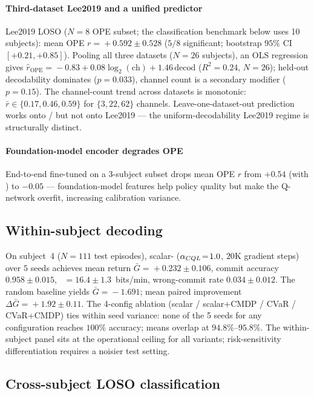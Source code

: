\paragraph*{Third-dataset Lee2019 and a unified predictor}
Lee2019 LOSO ($N\!=\!8$ OPE subset; the classification benchmark
below uses 10 subjects): mean OPE
$r\!=\!+0.592\!\pm\!0.528$ ($5/8$ significant; bootstrap $95\%$ CI
$[+0.21, +0.85]$). Pooling all three datasets ($N\!=\!26$
subjects), an OLS regression gives
$\hat r_{\text{OPE}}\!=\!-0.83+0.08\log_2(\text{ch})+1.46\,\text{decod}$
($R^2\!=\!0.24$, $N\!=\!26$); held-out decodability dominates
($p\!=\!0.033$), channel count is a secondary modifier
($p\!=\!0.15$). The channel-count trend across datasets is
monotonic: $\bar r \in \{0.17, 0.46, 0.59\}$ for $\{3, 22, 62\}$
channels. Leave-one-dataset-out prediction works onto
\bcib{}/\bcia{} but not onto Lee2019 --- the uniform-decodability
Lee2019 regime is structurally distinct.

\paragraph*{Foundation-model encoder degrades OPE}
End-to-end fine-tuned \labram{} on a 3-subject subset drops mean
OPE $r$ from $+0.54$ (with \eegnet{}) to $-0.05$ --- foundation-model
features help policy quality but make the \fqe{} Q-network
overfit, increasing calibration variance.

\subsection{Within-subject decoding}\label{sec:results:within}

On \bcib{} subject~4 ($N\!=\!111$ test episodes), \nettype{}
scalar-\cql{} ($\alpha_{CQL}\!=\!1.0$, $20$K gradient steps) over
$5$ seeds achieves mean return $\bar G\!=\!+0.232 \pm 0.106$,
commit accuracy $0.958 \pm 0.015$, \itr{}~$=\!16.4 \pm 1.3$~bits/min,
wrong-commit rate $0.034 \pm 0.012$. The random baseline yields
$\bar G\!=\!-1.691$; mean paired improvement
$\Delta \bar G\!=\!+1.92 \pm 0.11$. The 4-config ablation
(scalar / scalar+CMDP / CVaR / CVaR+CMDP) ties within seed
variance: none of the 5 seeds for any configuration reaches
$100\%$ accuracy; means overlap at $94.8\%$--$95.8\%$. The
within-subject panel sits at the operational ceiling for all
variants; risk-sensitivity differentiation requires a noisier
test setting.

\subsection{Cross-subject LOSO classification}\label{sec:results:loso}


